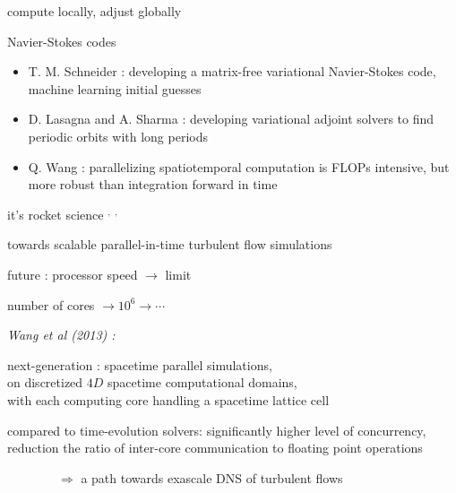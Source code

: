 \begin{frame}{compute locally, adjust globally}
\begin{block}{Navier-Stokes codes}
\begin{itemize}
 \item
T. M. Schneider : developing a matrix-free variational Navier-Stokes code,
machine learning initial guesses
 \item
D. Lasagna and A. Sharma  : developing variational adjoint solvers to
find periodic orbits with long periods
 \item
Q. Wang : parallelizing {\color{red}spatiotemporal}
computation is FLOPs intensive, but more robust than
integration forward in time
\end{itemize}
\end{block}

\vfill\hfill
it's rocket science%
$^,$%
$^,$%
\end{frame}


\begin{frame}{
towards scalable parallel-in-time turbulent flow simulations
}
\begin{block}{future :}%
processor speed $\to$ limit

\medskip

number of cores $\to 10^6 \to \cdots$

\medskip
\end{block}

\emph{Wang et al (2013)
    :} %

next-generation : spacetime parallel
simulations, \\
on discretized $4D$ spacetime
computational domains, \\
with each computing core handling a spacetime lattice cell

\bigskip

compared to time-evolution solvers:
significantly higher level of concurrency, reduction the ratio of
inter-core communication to floating point operations

\bigskip

$\qquad\qquad\Rightarrow$ a path towards exascale DNS of turbulent flows
\end{frame}

